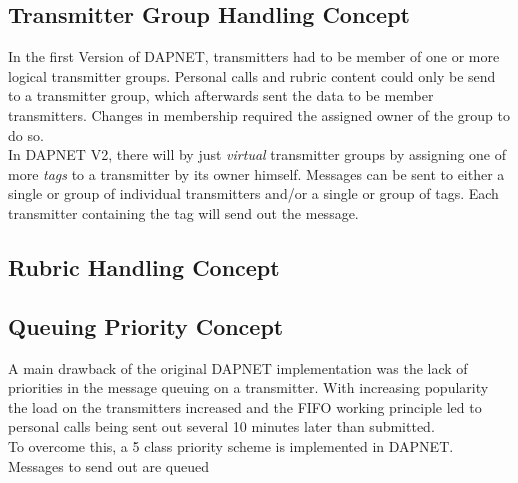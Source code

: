 \subsection{Transmitter Group Handling Concept}
In the first Version of DAPNET, transmitters had to be member of one or more logical transmitter groups. Personal calls and rubric content could only be send to a transmitter group, which afterwards sent the data to be member transmitters. Changes in membership required the assigned owner of the group to do so.\\
In DAPNET V2, there will by just \textit{virtual} transmitter groups by assigning one of more \textit{tags} to a transmitter by its owner himself. Messages can be sent to either a single or group of individual transmitters and/or a single or group of tags. Each transmitter containing the tag will send out the message.


\subsection{Rubric Handling Concept}

\subsection{Queuing Priority Concept}
A main drawback of the original DAPNET implementation was the lack of priorities in the message queuing on a transmitter. With increasing popularity the load on the transmitters increased and the FIFO working principle led to personal calls being sent out several 10 minutes later than submitted.\\
To overcome this, a 5 class priority scheme is implemented in DAPNET. Messages to send out are queued 

